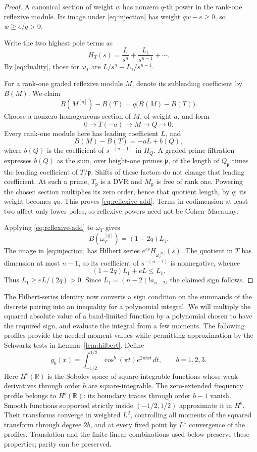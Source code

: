 \documentclass[11pt]{article}
\theoremstyle{definition}
\theoremstyle{remark}
\numberwithin{equation}{section}
\newcommand{\R}{\mathbb R}
\newcommand{\dd}{\,d}
\begin{document}
\begin{proof}
A canonical section of weight \(w\) has nonzero \(q\)-th power in the rank-one reflexive module. Its image under \eqref{eq:injection} has weight \(qw-e\ge0\), so \(w\ge e/q>0\).

Write the two highest pole terms as
\[
H_T(s)=\frac L{s^n}+\frac{L_1}{s^{n-1}}+\cdots.
\]
By \eqref{eq:duality}, those for \(\omega_T\) are \(L/s^n-L_1/s^{n-1}\).

For a rank-one graded reflexive module \(M\), denote its subleading coefficient by \(B(M)\). We claim
\begin{equation}\label{eq:reflexive-add}
B(M^{[q]})-B(T)=q\bigl(B(M)-B(T)\bigr).
\end{equation}
Choose a nonzero homogeneous section of \(M\), of weight \(a\), and form
\[
0\longrightarrow T(-a)\longrightarrow M\longrightarrow Q\longrightarrow0.
\]
Every rank-one module here has leading coefficient \(L\), and
\[
B(M)-B(T)=-aL+b(Q),
\]
where \(b(Q)\) is the coefficient of \(s^{-(n-1)}\) in \(H_Q\). A graded prime filtration expresses \(b(Q)\) as the sum, over height-one primes \(\mathfrak p\), of the length of \(Q_{\mathfrak p}\) times the leading coefficient of \(T/\mathfrak p\). Shifts of these factors do not change that leading coefficient. At such a prime, \(T_{\mathfrak p}\) is a DVR and \(M_{\mathfrak p}\) is free of rank one. Powering the chosen section multiplies its zero order, hence that quotient length, by \(q\); its weight becomes \(qa\). This proves \eqref{eq:reflexive-add}. Terms in codimension at least two affect only lower poles, so reflexive powers need not be Cohen--Macaulay.

Applying \eqref{eq:reflexive-add} to \(\omega_T\) gives
\[
B(\omega_T^{[q]})=(1-2q)L_1.
\]
The image in \eqref{eq:injection} has Hilbert series
\(e^{es}H_{\omega_T^{[q]}}(s)\). The quotient in \(T\) has dimension at most \(n-1\), so its coefficient of \(s^{-(n-1)}\) is nonnegative, whence
\[
(1-2q)L_1+eL\le L_1.
\]
Thus \(L_1\ge eL/(2q)>0\). Since \(L_1=(n-2)!a_{n-2}\), the claimed sign follows.
\end{proof}

The Hilbert-series identity now converts a sign condition on the summands of the discrete pairing into an inequality for a polynomial integral. We will multiply the squared absolute value of a band-limited function by a polynomial chosen to have the required sign, and evaluate the integral from a few moments. The following profiles provide the needed moment values while permitting approximation by the Schwartz tests in Lemma~\ref{lem:hilbert}. Define
\[
g_b(x)=\int_{-1/2}^{1/2}\cos^b(\pi t)e^{2\pi ixt}\dd t,
\qquad b=1,2,3.
\]
Here \(H^b(\R)\) is the Sobolev space of square-integrable functions whose weak derivatives through order \(b\) are square-integrable. The zero-extended frequency profile belongs to \(H^b(\R)\): its boundary traces through order \(b-1\) vanish. Smooth functions supported strictly inside \((-1/2,1/2)\) approximate it in \(H^b\). Their transforms converge in weighted \(L^2\), controlling all moments of the squared transform through degree \(2b\), and at every fixed point by \(L^1\) convergence of the profiles. Translation and the finite linear combinations used below preserve these properties; parity can be preserved.
\end{document}
